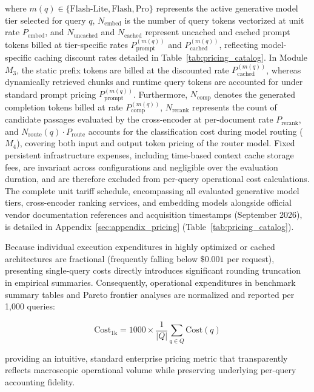 where $m(q) \in \{\text{Flash-Lite}, \text{Flash}, \text{Pro}\}$ represents the active generative model tier selected for query $q$, $N_{\text{embed}}$ is the number of query tokens vectorized at unit rate $P_{\text{embed}}$, and $N_{\text{uncached}}$ and $N_{\text{cached}}$ represent uncached and cached prompt tokens billed at tier-specific rates $P_{\text{prompt}}^{(m(q))}$ and $P_{\text{cached}}^{(m(q))}$, reflecting model-specific caching discount rates detailed in Table~\ref{tab:pricing_catalog}. In Module $M_3$, the static prefix tokens are billed at the discounted rate $P_{\text{cached}}^{(m(q))}$, whereas dynamically retrieved chunks and runtime query tokens are accounted for under standard prompt pricing $P_{\text{prompt}}^{(m(q))}$. Furthermore, $N_{\text{comp}}$ denotes the generated completion tokens billed at rate $P_{\text{comp}}^{(m(q))}$, $N_{\text{rerank}}$ represents the count of candidate passages evaluated by the cross-encoder at per-document rate $P_{\text{rerank}}$, and $N_{\text{route}}(q) \cdot P_{\text{route}}$ accounts for the classification cost during model routing ($M_4$), covering both input and output token pricing of the router model. Fixed persistent infrastructure expenses, including time-based context cache storage fees, are invariant across configurations and negligible over the evaluation duration, and are therefore excluded from per-query operational cost calculations. The complete unit tariff schedule, encompassing all evaluated generative model tiers, cross-encoder ranking services, and embedding models alongside official vendor documentation references and acquisition timestamps (September 2026), is detailed in Appendix~\ref{sec:appendix_pricing} (Table~\ref{tab:pricing_catalog}).

Because individual execution expenditures in highly optimized or cached architectures are fractional (frequently falling below $\$0.001$ per request), presenting single-query costs directly introduces significant rounding truncation in empirical summaries. Consequently, operational expenditures in benchmark summary tables and Pareto frontier analyses are normalized and reported per 1,000 queries:

\begin{equation}
\label{eq:cost_1k}
\text{Cost}_{1\text{k}} = 1000 \times \frac{1}{|Q|} \sum_{q \in Q} \text{Cost}(q)
\end{equation}

providing an intuitive, standard enterprise pricing metric that transparently reflects macroscopic operational volume while preserving underlying per-query accounting fidelity.

